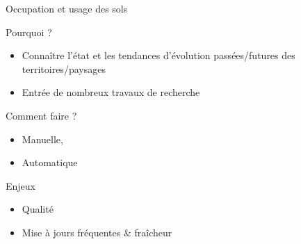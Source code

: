 \documentclass[pressentation,10pt,aspectratio=1610, xcolor=table]{beamer}
\begin{document}
\begin{frame}[fragile,label={sec:org33a7219}]{Occupation et usage des sols}
\begin{block}{Pourquoi ?}
\begin{itemize}
\item Connaître l'état et les tendances d'évolution passées/futures des territoires/paysages
\item Entrée de nombreux travaux de recherche
\end{itemize}
\end{block}
\begin{block}{Comment faire ?}
\begin{itemize}
\item Manuelle,
\item Automatique
\end{itemize}
\end{block}
\begin{block}{Enjeux}
\begin{itemize}
\item Qualité
\item Mise à jours fréquentes \& fraîcheur
\end{itemize}
\end{block}
\end{frame}
\end{document}
